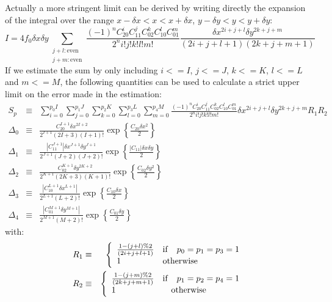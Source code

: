 \documentclass{article}
\begin{document}
Actually a more stringent limit can be derived by writing directly the
expansion of the integral over the range $x-\delta x<x<x+\delta x$, $y-\delta
y< y < y+\delta y$:
\begin{equation}
	I=4f_0\delta x\delta
	y\sum_{\begin{array}{c}j+l:\mathrm{even}\\j+m:\mathrm{even}\end{array}}
	\frac{(-1)^n C_20^i C_{11}^j C_{02}^k C_{10}^l C_{01}^m}{2^n i!j!k!l!m!}
	\frac{\delta x^{2i+j+l} \delta y^{2k+j+m}}{(2i+j+l+1)(2k+j+m+1)}
\end{equation}
If we estimate the sum by only including $i<=I$, $j<=J$, $k<=K$, $l<=L$ and
$m<=M$, the following quantities can be used to calculate a strict upper
limit on the error made in the estimation:
\begin{eqnarray}
	S_p & \equiv & \sum_{i=0}^{p_0 I} \sum_{j=0}^{p_1 J} \sum_{k=0}^{p_2 K}
	\sum_{l=0}^{p_3 L} \sum_{m=0}^{p_4 M}
	\frac{(-1)^n C_20^i C_{11}^j C_{02}^k C_{10}^l C_{01}^m}{2^n i!j!k!l!m!}
	\delta x^{2i+j+l} \delta y^{2k+j+m} R_1 R_2\\
	\Delta_0 & \equiv &
	\frac{C_{20}^{I+1} \delta x^{2I+2}}{2^{I+1} (2I+3)(I+1)!}
	\exp\left\{ \frac{C_{20}\delta x^2}{2} \right\} \\
	\Delta_1 & \equiv & \frac{\left|C_{11}^{J+1}\right|
		\delta x^{J+1}\delta y^{J+1}}{2^{J+1} (J+2)(J+2)!}
	\exp\left\{ \frac{\left|C_{11}\right|\delta x\delta y}{2} \right\} \\
	\Delta_2 & \equiv &
	\frac{C_{02}^{K+1} \delta y^{2K+2}}{2^{K+1} (2K+3)(K+1)!}
	\exp\left\{ \frac{C_{02}\delta y^2}{2} \right\} \\
	\Delta_3 & \equiv &  \frac{\left|C_{10}^{L+1}\delta x^{L+1}\right|}
	{2^{L+1} (L+2)!} \exp\left\{ \frac{C_{10}\delta x}{2} \right\} \\
	\Delta_4 & \equiv &  \frac{\left|C_{01}^{M+1} \delta y^{M+1}\right|}
	{2^{M+1} (M+2)!} \exp\left\{ \frac{C_{01}\delta y}{2} \right\} 
\end{eqnarray}
with:
\begin{eqnarray}
	R_1 & \equiv & \left\{ \begin{array}{l@{\quad}l}
		\frac{1-(j+l) \% 2}{(2i+j+l+1)} &
			\mathrm{if} \quad p_0=p_1=p_3=1\\
		1 & \mathrm{otherwise}
	\end{array}\right.\\
	R_2 & \equiv & \left\{ \begin{array}{l@{\quad}l}
		\frac{1-(j+m) \% 2}{(2k+j+m+1)} &
		\mathrm{if} \quad p_1=p_2=p_4=1\\
		1 & \quad \mathrm{otherwise}
	\end{array}\right.
\end{eqnarray}
\end{document}
